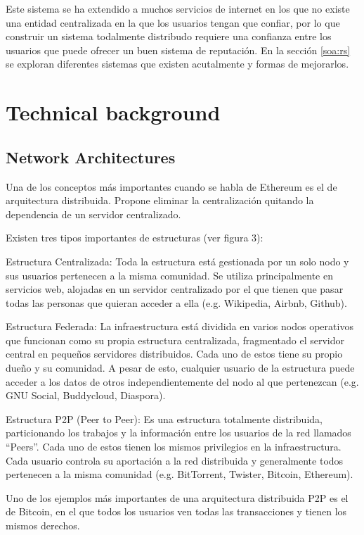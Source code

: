Este sistema se ha extendido a muchos servicios de internet en los que no existe
una entidad centralizada en la que los usuarios tengan que confiar, por lo que
construir un sistema todalmente distribudo requiere una confianza entre los
usuarios que puede ofrecer un buen sistema de reputación. En la sección
\ref{soa:rs} se exploran diferentes sistemas que existen acutalmente y formas de
mejorarlos.

\section{Technical background}
\label{tb}
\subsection{Network Architectures}
\label{tb:na}
 Una de los conceptos más importantes cuando se
habla de Ethereum es el de arquitectura distribuida. Propone eliminar la
centralización quitando la dependencia de un servidor centralizado.

Existen tres tipos importantes de estructuras (ver figura 3):

Estructura Centralizada: Toda la estructura está gestionada por un solo nodo y
sus usuarios pertenecen a la misma comunidad. Se utiliza principalmente en
servicios web, alojadas en un servidor centralizado por el que tienen que pasar
todas las personas que quieran acceder a ella (e.g. Wikipedia, Airbnb, Github).

Estructura Federada: La infraestructura está dividida en varios nodos operativos
que funcionan como su propia estructura centralizada, fragmentado el servidor
central en pequeños servidores distribuidos. Cada uno de estos tiene su propio
dueño y su comunidad. A pesar de esto, cualquier usuario de la estructura puede
acceder a los datos de otros independientemente del nodo al que pertenezcan
(e.g. GNU Social, Buddycloud, Diaspora).

Estructura P2P (Peer to Peer): Es una estructura totalmente distribuida,
particionando los trabajos y la información entre los usuarios de la red
llamados “Peers”. Cada uno de estos tienen los mismos privilegios en la
infraestructura. Cada usuario controla su aportación a la red distribuida y
generalmente todos pertenecen a la misma comunidad (e.g. BitTorrent, Twister,
Bitcoin, Ethereum).


Uno de los ejemplos más importantes de una arquitectura distribuida P2P es el de
Bitcoin, en el que todos los usuarios ven todas las transacciones y tienen los
mismos derechos.

